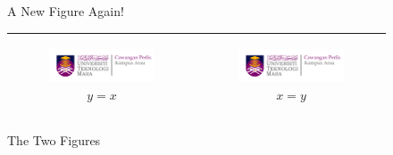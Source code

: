 \begin{figure}[ht]
    \centering
    \caption{A New Figure Again!}
    \label{fig:newfig}
\end{figure}

\lipsum[2]

\begin{figure}[ht]
    \centering
    \begin{tabular}{|c|c|}
    \hline
     \begin{subfigure}[b]{0.44\textwidth}
         \centering
         \includegraphics[width=.8\linewidth]{mainmatter/images/logouitm.png}
         \caption{$y=x$}
         \label{fig:y_equals_x}
     \end{subfigure} &
     \begin{subfigure}[b]{0.44\textwidth}
         \centering
         \includegraphics[width=.8\linewidth]{mainmatter/images/logouitm.png}
         \caption{$x=y$}
         \label{fig:x_equals_y}
     \end{subfigure} \\
     \hline
    \end{tabular}
    \caption{The Two Figures}
    \label{fig:the2fig}
\end{figure}

\lipsum[1]

